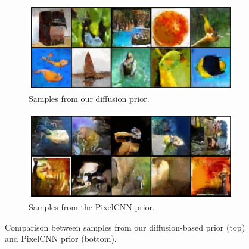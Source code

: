 \documentclass[nohyperref]{article}
\theoremstyle{plain}
\theoremstyle{definition}
\theoremstyle{remark}
\begin{document}
\begin{figure}[h!]

\begin{subfigure}{\linewidth}
    \centering
    \includegraphics[width=1.\linewidth]{images/ours/samples2.png}
    \caption{Samples from our diffusion prior.}
    \label{fig:diffusion_samples}
\end{subfigure}
\begin{subfigure}{\linewidth}
    \centering
    \includegraphics[width=1.\linewidth]{images/ours/pixel_samples.png}
    \caption{Samples from the PixelCNN prior.}
    \label{fig:pixel_samples}
\end{subfigure}
\caption{Comparison between samples from our diffusion-based prior (top) and PixelCNN prior (bottom).}
\label{fig:figures}
\end{figure}
\end{document}
